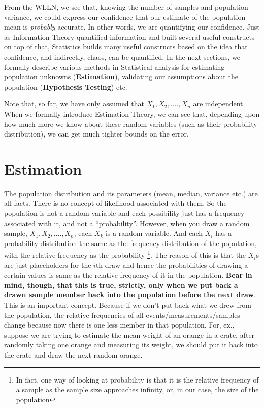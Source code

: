 From the WLLN, we see that, knowing the number of samples and population variance, we could express our confidence that our estimate of the population mean is \emph{probably} accurate. In other words, we are quantifying our confidence. Just as Information Theory quantified information and built several useful constructs on top of that, Statistics builds many useful constructs based on the idea that confidence, and indirectly, chaos, can be quantified. In the next sections, we formally describe various methods in Statistical analysis for estimating population unknowns (\textbf{Estimation}), validating our assumptions about the population (\textbf{Hypothesis Testing}) etc. 

Note that, so far, we have only assumed that $X_1, X_2, ...., X_n$ are independent. When we formally introduce Estimation Theory, we can see that, depending upon how much more we know about these random variables (such as their probability distribution), we can get much tighter bounds on the error. 

\section{Estimation}
The population distribution and its parameters (mean, median, variance etc.) are all facts. There is no concept of likelihood associated with them. So the population is not a random variable and each possibility just has a frequency associated with it, and not a ``probability''. However, when you draw a random sample, $X_1, X_2, ...., X_n$, each $X_k$ is a random variable. And each $X_i$ has a probability distribution the same as the frequency distribution of the population, with the relative frequency as the probability \footnote{In fact, one way of looking at probability is that it is the relative frequency of a sample as the sample size approaches infinity, or, in our case, the size of the population}. The reason of this is that the $X_i$s are just placeholders for the $i$th draw and hence the probabilities of drawing a certain values is same as the relative frequency of it in the population. \textbf{Bear in mind, though, that this is true, strictly, only when we put back a drawn sample member back into the population before the next draw}. This is an important concept. Because if we don't put back what we drew from the population, the relative frequencies of all events/measurements/samples change because now there is one less member in that population. For, ex., suppose we are trying to estimate the mean weight of an orange in a crate, after randomly taking one orange and measuring its weight, we should put it back into the crate and draw the next random orange. 

